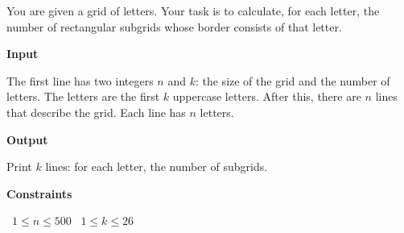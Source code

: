 You are given a grid of letters. Your task is to calculate, for each letter, the number of rectangular subgrids whose border consists of that letter.

\vspace{0.3cm}\noindent\textbf{Input}

The first line has two integers $n$ and $k$: the size of the grid and the number of letters. The letters are the first $k$ uppercase letters.
After this, there are $n$ lines that describe the grid. Each line has $n$ letters.

\vspace{0.3cm}\noindent\textbf{Output}

Print $k$ lines: for each letter, the number of subgrids.

\vspace{0.3cm}\noindent\textbf{Constraints}

\textbullet\ $1 \le n \le 500$
\textbullet\ $1 \le k \le 26$